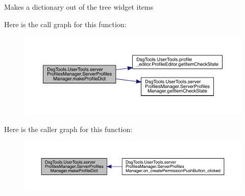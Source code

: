 \begin{DoxyVerb}Makes a dictionary out of the tree widget items
\end{DoxyVerb}
 Here is the call graph for this function\+:
\nopagebreak
\begin{figure}[H]
\begin{center}
\leavevmode
\includegraphics[width=350pt]{class_dsg_tools_1_1_user_tools_1_1server_profiles_manager_1_1_server_profiles_manager_aad84d9e38d3a08eb25942bacd8c15136_cgraph}
\end{center}
\end{figure}
Here is the caller graph for this function\+:
\nopagebreak
\begin{figure}[H]
\begin{center}
\leavevmode
\includegraphics[width=350pt]{class_dsg_tools_1_1_user_tools_1_1server_profiles_manager_1_1_server_profiles_manager_aad84d9e38d3a08eb25942bacd8c15136_icgraph}
\end{center}
\end{figure}
\mbox{\label{class_dsg_tools_1_1_user_tools_1_1server_profiles_manager_1_1_server_profiles_manager_ae57c52cca6ff6868a27dabc60808cd14}} 
